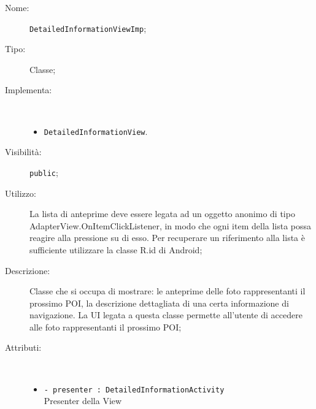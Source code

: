 \documentclass[../DefinizioneDiProdotto.tex]{subfiles}
\begin{document}
    \begin{description}
\item[Nome:] \texttt{DetailedInformationViewImp};
\item[Tipo:] Classe;
\item[Implementa:] \
\begin{itemize}
\item \texttt{DetailedInformationView}.

\end{itemize}
\item[Visibilità:] \texttt{public};
\item[Utilizzo:] La lista di anteprime deve essere legata ad un oggetto anonimo di tipo AdapterView.OnItemClickListener, in modo che ogni item della lista possa reagire alla pressione su di esso. Per recuperare un riferimento alla lista è sufficiente utilizzare la classe R.id di Android;
\item[Descrizione:] Classe che si occupa di mostrare: le anteprime delle foto rappresentanti il prossimo POI, la descrizione dettagliata di una certa informazione di navigazione. La UI legata a questa classe permette all'utente di accedere alle foto rappresentanti il prossimo POI;
\item[Attributi:] \
\begin{itemize}
\item \texttt{- presenter : DetailedInformationActivity}\\
Presenter della View


\end{itemize}
\end{description}
\end{document}
